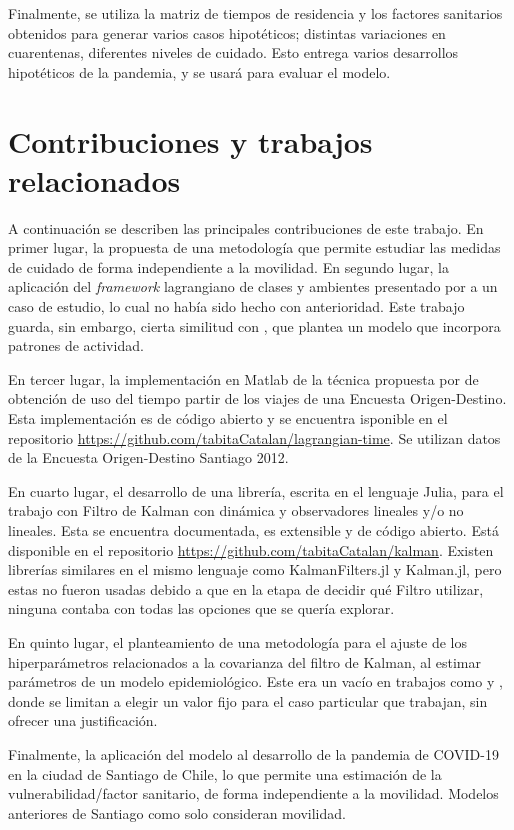\begin{intro}
Finalmente, se utiliza la matriz de tiempos de residencia y los factores sanitarios obtenidos para generar varios casos hipotéticos; distintas variaciones en cuarentenas, diferentes niveles de cuidado. Esto entrega varios desarrollos hipotéticos de la pandemia, y se usará para evaluar el modelo.


\section*{Contribuciones y trabajos relacionados}

A continuación se describen las principales contribuciones de este trabajo. En primer lugar, la propuesta de una metodología que permite estudiar las medidas de cuidado de forma independiente a la movilidad. En segundo lugar, la aplicación del \textit{framework} lagrangiano de clases y ambientes presentado por \cite{Bichara2018} a un caso de estudio, lo cual no había sido hecho con anterioridad. Este trabajo guarda, sin embargo, cierta similitud con \cite{Shikhmurzaev}, que plantea un modelo que incorpora patrones de actividad.

En tercer lugar, la implementación en Matlab de la técnica propuesta por \cite{Munizaga2011} de obtención de uso del tiempo partir de los viajes de una Encuesta Origen-Destino. Esta implementación es de código abierto y se encuentra isponible en el repositorio \url{https://github.com/tabitaCatalan/lagrangian-time}. Se utilizan datos de la Encuesta Origen-Destino Santiago 2012.

En cuarto lugar, el desarrollo de una librería, escrita en el lenguaje Julia, para el trabajo con Filtro de Kalman con dinámica y observadores lineales y/o no lineales. Esta se encuentra documentada, es extensible y de código abierto. Está disponible en el repositorio \url{https://github.com/tabitaCatalan/kalman}. Existen librerías similares en el mismo lenguaje como KalmanFilters.jl y Kalman.jl, pero estas no fueron usadas debido a que en la etapa de decidir qué Filtro utilizar, ninguna contaba con todas las opciones que se quería explorar. 

En quinto lugar, el planteamiento de una metodología para el ajuste de los hiperparámetros relacionados a la covarianza del filtro de Kalman, al estimar parámetros de un modelo epidemiológico. Este era un vacío en trabajos como \cite{Hasan2020} y \cite{Sameni2020}, donde se limitan a elegir un valor fijo para el caso particular que trabajan, sin ofrecer una justificación.

Finalmente, la aplicación del modelo al desarrollo de la pandemia de COVID-19 en la ciudad de Santiago de Chile, lo que permite una estimación de la vulnerabilidad/factor sanitario, de forma independiente a la movilidad. Modelos anteriores de Santiago como \cite{Gozzi2021} solo consideran movilidad.



\end{intro}
